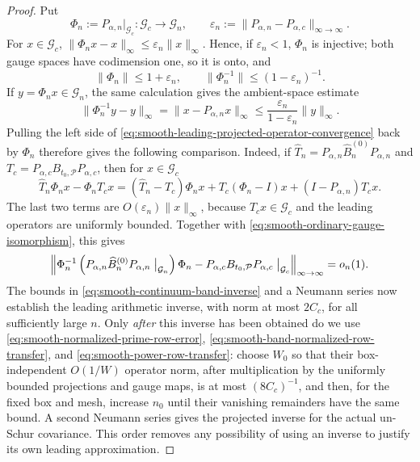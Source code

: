 \documentclass[11pt]{article}
\numberwithin{equation}{section}
\theoremstyle{definition}
\theoremstyle{remark}
\newcommand{\1}{\mathbf 1}
\begin{document}
\begin{proof}
Put
\[
 \Phi_n:=P_{\alpha,n}|_{\mathcal G_c}:
       \mathcal G_c\longrightarrow\mathcal G_n,\qquad
 \varepsilon_n:=\|P_{\alpha,n}-P_{\alpha,c}\|_{\infty\to\infty}.
\]
For \(x\in\mathcal G_c\),
\(\|\Phi_nx-x\|_\infty\leq\varepsilon_n\|x\|_\infty\).  Hence, if
\(\varepsilon_n<1\), \(\Phi_n\) is injective; both gauge spaces have
codimension one, so it is onto, and
\begin{equation}
 \|\Phi_n\|\leq1+\varepsilon_n,\qquad
 \|\Phi_n^{-1}\|\leq(1-\varepsilon_n)^{-1}.
 \label{eq:smooth-ordinary-gauge-isomorphism}
\end{equation}
If \(y=\Phi_nx\in\mathcal G_n\), the same calculation gives the
ambient-space estimate
\[
 \|\Phi_n^{-1}y-y\|_\infty
 =\|x-P_{\alpha,n}x\|_\infty
 \leq\frac{\varepsilon_n}{1-\varepsilon_n}\|y\|_\infty.
\]
Pulling the left side of
\eqref{eq:smooth-leading-projected-operator-convergence} back by \(\Phi_n\)
therefore gives the following comparison.  Indeed, if
\(\widehat T_n=P_{\alpha,n}\widehat B_n^{(0)}P_{\alpha,n}\) and
\(T_c=P_{\alpha,c}B_{t_0,\mathcal P}P_{\alpha,c}\), then for
\(x\in\mathcal G_c\)
\[
 \widehat T_n\Phi_nx-\Phi_nT_cx
 =(\widehat T_n-T_c)\Phi_nx
   +T_c(\Phi_n-I)x+(I-P_{\alpha,n})T_cx.
\]
The last two terms are \(O(\varepsilon_n)\|x\|_\infty\), because
\(T_cx\in\mathcal G_c\) and the leading operators are uniformly bounded.
Together with \eqref{eq:smooth-ordinary-gauge-isomorphism}, this gives
\begin{equation}
 \left\|\Phi_n^{-1}
   \left(P_{\alpha,n}\widehat B_n^{(0)}P_{\alpha,n}
       \bigm|_{\mathcal G_n}\right)\Phi_n
  -P_{\alpha,c}B_{t_0,\mathcal P}P_{\alpha,c}
       \bigm|_{\mathcal G_c}\right\|_{\infty\to\infty}=o_n(1).
 \label{eq:smooth-pulled-ordinary-operator-convergence}
\end{equation}
The bounds in \eqref{eq:smooth-continuum-band-inverse} and a Neumann
series now establish the leading arithmetic inverse, with norm at most
\(2C_c\), for all sufficiently large \(n\).  Only \emph{after} this
inverse has been obtained do we use
\eqref{eq:smooth-normalized-prime-row-error},
\eqref{eq:smooth-band-normalized-row-transfer}, and
\eqref{eq:smooth-power-row-transfer}: choose \(W_0\) so that their
box-independent \(O(1/W)\) operator norm, after multiplication by the
uniformly bounded projections and gauge maps, is at most
\((8C_c)^{-1}\), and then, for the fixed box and mesh, increase \(n_0\)
until their vanishing remainders have the same bound.  A second Neumann
series gives the projected inverse for the actual un-Schur covariance.
This order removes any possibility of using an inverse to justify its
own leading approximation.


\end{proof}
\end{document}
